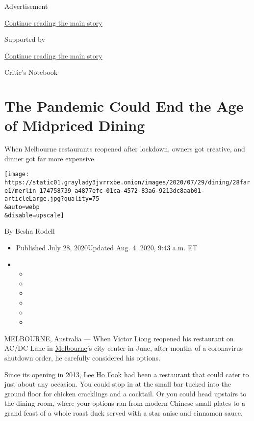 Advertisement

\protect\hyperlink{after-top}{Continue reading the main story}

Supported by

\protect\hyperlink{after-sponsor}{Continue reading the main story}

Critic's Notebook

\hypertarget{the-pandemic-could-end-the-age-of-midpriced-dining}{%
\section{The Pandemic Could End the Age of Midpriced
Dining}\label{the-pandemic-could-end-the-age-of-midpriced-dining}}

When Melbourne restaurants reopened after lockdown, owners got creative,
and dinner got far more expensive.

\texttt{[image: https://static01.graylady3jvrrxbe.onion/images/2020/07/29/dining/28fare1/merlin\_174758739\_a4877efc-01ca-4572-83a6-9213dc8aab01-articleLarge.jpg?quality=75\\\&auto=webp\\\&disable=upscale]}

By Besha Rodell

\begin{itemize}
\item
  Published July 28, 2020Updated Aug. 4, 2020, 9:43 a.m. ET
\item
  \begin{itemize}
  \item
  \item
  \item
  \item
  \item
  \item
  \end{itemize}
\end{itemize}

MELBOURNE, Australia --- When Victor Liong reopened his restaurant on
AC/DC Lane in
\href{https://www.nytimes3xbfgragh.onion/2020/08/04/world/australia/coronavirus-melbourne-lockdown.html}{Melbourne}'s
city center in June, after months of a coronavirus shutdown order, he
carefully considered his options.

Since its opening in 2013, \href{https://www.leehofook.com.au/}{Lee Ho
Fook} had been a restaurant that could cater to just about any occasion.
You could stop in at the small bar tucked into the ground floor for
chicken cracklings and a cocktail. Or you could head upstairs to the
dining room, where your options ran from modern Chinese small plates to
a grand feast of a whole roast duck served with a star anise and
cinnamon sauce.

